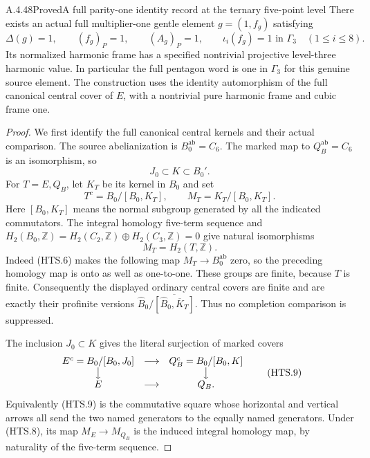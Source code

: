 \begin{result}{A.4.48}{Proved}{A full parity-one identity record at the ternary five-point level}
There exists an actual full multiplier-one gentle
element $g=(1,f_g)$ satisfying
\[
 \Delta(g)=1,\qquad (f_g)_P=1,
 \qquad (A_g)_P=1,
 \qquad \iota_i(f_g)=1\text{ in }\Gamma_3
                  \quad(1\leq i\leq8).
 \tag{HTS.5}
\]
Its normalized harmonic frame has a specified
nontrivial projective level-three harmonic value.
In particular the full pentagon word is one in
$\Gamma_3$ for this genuine source element.
The construction uses the identity automorphism of
the full canonical central cover of $E$, with a
nontrivial pure harmonic frame and cubic frame one.
\end{result}

\begin{proof}
We first identify the full canonical central kernels
and their actual comparison.  The source
abelianization is $B_0^{\mathrm{ab}}=C_6$.
The marked map to $Q_B^{\mathrm{ab}}=C_6$ is an
isomorphism, so
\[
                  J_0\subset K\subset B_0'.
 \tag{HTS.6}
\]
For $T=E,Q_B$, let $K_T$ be its kernel in $B_0$ and
set
\[
 T^c=B_0/[B_0,K_T],\qquad
 M_T=K_T/[B_0,K_T].
 \tag{HTS.7}
\]
Here $[B_0,K_T]$ means the normal subgroup generated
by all the indicated commutators.  The integral
homology five-term sequence
\cite[6.8.3, p.~196]{CA_WeibelHA1994} and
$H_2(B_0,\mathbb Z)=H_2(C_2,\mathbb Z)\oplus
H_2(C_3,\mathbb Z)=0$ give natural isomorphisms
\[
                       M_T=H_2(T,\mathbb Z).
 \tag{HTS.8}
\]
Indeed (HTS.6) makes the following map
$M_T\to B_0^{\mathrm{ab}}$ zero, so the preceding
homology map is onto as well as one-to-one.
These groups are finite, because $T$ is finite.
Consequently the displayed ordinary central covers
are finite and are exactly their profinite versions
$\widehat B_0/\overline{[\widehat B_0,\overline K_T]}$.
Thus no completion comparison is suppressed.

The inclusion $J_0\subset K$ gives the literal
surjection of marked covers
\[
 \begin{array}{ccc}
 E^c=B_0/[B_0,J_0]&\longrightarrow&Q_B^c=B_0/[B_0,K]\\
 \big\downarrow&&\big\downarrow\\
 E&\longrightarrow&Q_B .
 \end{array}                                        \tag{HTS.9}
\]
Equivalently (HTS.9) is the commutative square whose
horizontal and vertical arrows all send the two
named generators to the equally named generators.
Under (HTS.8), its map $M_E\to M_{Q_B}$ is the
induced integral homology map, by naturality of the
five-term sequence.


\end{proof}
